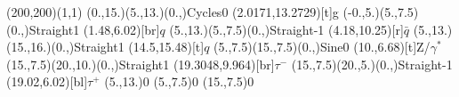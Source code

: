 \documentclass[12pt]{article}
\begin{document}
 
 \thispagestyle{empty}
	
 \begin{feynartspicture}(200,200)(1,1) 
 \FADiagram{} 
\FAProp(0.,15.)(5.,13.)(0.,){Cycles}{0}
\FALabel(2.0171,13.2729)[t]{g}
\FAProp(-0.,5.)(5.,7.5)(0.,){Straight}{1}
\FALabel(1.48,6.02)[br]{$q$}
\FAProp(5.,13.)(5.,7.5)(0.,){Straight}{-1}
\FALabel(4.18,10.25)[r]{$\bar{q}$}
\FAProp(5.,13.)(15.,16.)(0.,){Straight}{1}
\FALabel(14.5,15.48)[t]{$q$}
\FAProp(5.,7.5)(15.,7.5)(0.,){Sine}{0}
\FALabel(10.,6.68)[t]{Z/$\gamma^*$}
\FAProp(15.,7.5)(20.,10.)(0.,){Straight}{1}
\FALabel(19.3048,9.964)[br]{$\tau^-$}
\FAProp(15.,7.5)(20.,5.)(0.,){Straight}{-1}
\FALabel(19.02,6.02)[bl]{$\tau^+$}
\FAVert(5.,13.){0}
\FAVert(5.,7.5){0}
\FAVert(15.,7.5){0}
	
 
 \end{feynartspicture} 
 
\end{document}
